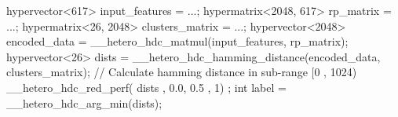 hypervector<617> input_features = ...; 
hypermatrix<2048, 617> rp_matrix = ...;
hypermatrix<26, 2048> clusters_matrix = ...;
hypervector<2048> encoded_data = __hetero_hdc_matmul(input_features, rp_matrix);
hypervector<26> dists = __hetero_hdc_hamming_distance(encoded_data, clusters_matrix);
// Calculate hamming distance in sub-range [0 , 1024)
__hetero_hdc_red_perf( dists , 0.0, 0.5 , 1) ;
int label = __hetero_hdc_arg_min(dists);